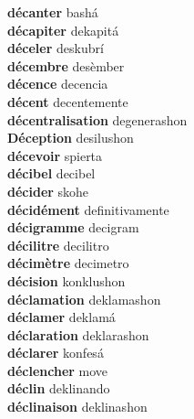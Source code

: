 \textbf{ décanter  } bashá \\
\textbf{ décapiter  } dekapitá \\
\textbf{ déceler  } deskubrí \\
\textbf{ décembre  } desèmber \\
\textbf{ décence  } decencia \\
\textbf{ décent  } decentemente \\
\textbf{ décentralisation  } degenerashon \\
\textbf{ Déception  } desilushon \\
\textbf{ décevoir  } spierta \\
\textbf{ décibel  } decibel \\
\textbf{ décider  } skohe \\
\textbf{ décidément  } definitivamente \\
\textbf{ décigramme  } decigram \\
\textbf{ décilitre  } decilitro \\
\textbf{ décimètre  } decimetro \\
\textbf{ décision  } konklushon \\
\textbf{ déclamation  } deklamashon \\
\textbf{ déclamer  } deklamá \\
\textbf{ déclaration  } deklarashon \\
\textbf{ déclarer  } konfesá \\
\textbf{ déclencher  } move \\
\textbf{ déclin  } deklinando \\
\textbf{ déclinaison  } deklinashon \\
